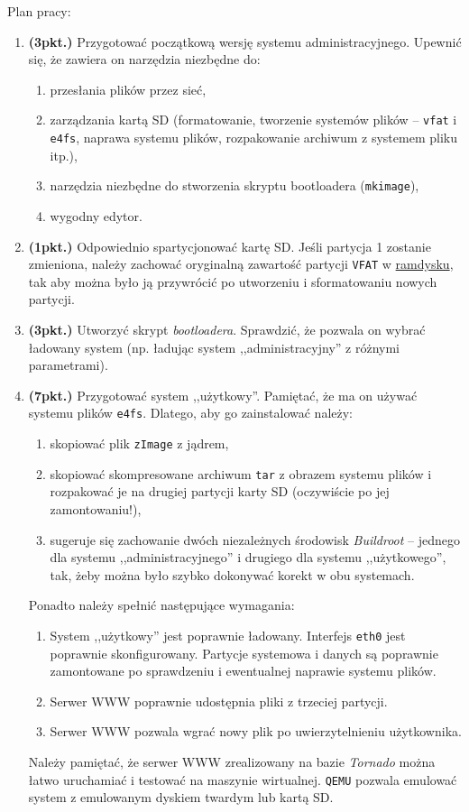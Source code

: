 \documentclass{article}
\begin{document}
Plan pracy:
\begin{enumerate}
	\item \textbf{(3pkt.)} Przygotować początkową wersję systemu administracyjnego. Upewnić się, że zawiera on narzędzia niezbędne do:
	\begin{enumerate}
		\item przesłania plików przez sieć,
		\item zarządzania kartą SD (formatowanie, tworzenie systemów plików -- \texttt{vfat} i \texttt{e4fs}, naprawa systemu plików, rozpakowanie archiwum z systemem pliku itp.),
		\item narzędzia niezbędne do stworzenia skryptu bootloadera (\texttt{mkimage}),
		\item wygodny edytor.
	\end{enumerate}
	\item \textbf{(1pkt.)} Odpowiednio spartycjonować kartę SD. Jeśli partycja 1 zostanie zmieniona, należy zachować oryginalną zawartość partycji \texttt{VFAT} w \href{https://www.kernel.org/doc/Documentation/filesystems/ramfs-rootfs-initramfs.txt}{ramdysku}, tak aby można było ją przywrócić po utworzeniu i sformatowaniu nowych partycji.
	\item \textbf{(3pkt.)} Utworzyć skrypt \emph{bootloadera}. Sprawdzić, że pozwala on wybrać ładowany system (np. ładując system ,,administracyjny'' z różnymi parametrami).
	\item \textbf{(7pkt.)} Przygotować system ,,użytkowy''. Pamiętać, że ma on używać systemu plików \texttt{e4fs}. Dlatego, aby go zainstalować należy:
		\begin{enumerate}
			\item skopiować plik \texttt{zImage} z jądrem,
			\item skopiować skompresowane archiwum \texttt{tar} z obrazem systemu plików i rozpakować je na drugiej partycji karty SD (oczywiście po jej zamontowaniu!),
			\item sugeruje się zachowanie dwóch niezależnych środowisk \emph{Buildroot} -- jednego dla systemu ,,administracyjnego'' i drugiego dla systemu ,,użytkowego'', tak, żeby można było szybko dokonywać korekt w obu systemach.
		\end{enumerate}
		Ponadto należy spełnić następujące wymagania:
		\begin{enumerate}
			\item System ,,użytkowy'' jest poprawnie ładowany. Interfejs \texttt{eth0} jest poprawnie skonfigurowany. Partycje systemowa i danych są poprawnie zamontowane po sprawdzeniu i ewentualnej naprawie systemu plików.
			\item Serwer WWW poprawnie udostępnia pliki z trzeciej partycji.
			\item Serwer WWW pozwala wgrać nowy plik po uwierzytelnieniu użytkownika.
		\end{enumerate}
		Należy pamiętać, że serwer WWW zrealizowany na bazie \emph{Tornado} można łatwo uruchamiać i testować na maszynie wirtualnej. \texttt{QEMU} pozwala emulować system z emulowanym dyskiem twardym lub kartą SD.
\end{enumerate}
\end{document}
